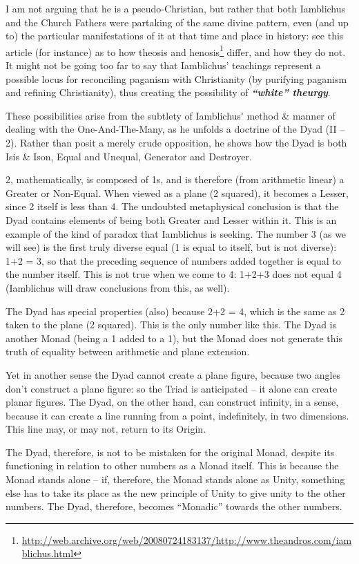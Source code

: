 I am not arguing that he is a pseudo-Christian, but rather that both Iamblichus and the Church Fathers were partaking of the same divine pattern, even (and up to) the particular manifestations of it at that time and place in history: see this article (for instance) as to how theosis and henosis\footnote{\url{http://web.archive.org/web/20080724183137/http://www.theandros.com/iamblichus.html}} differ, and how they do not. It might not be going too far to say that Iamblichus' teachings represent a possible locus for reconciling paganism with Christianity (by purifying paganism and refining Christianity), thus creating the possibility of \emph{\textbf{``white'' theurgy}}.


These possibilities arise from the subtlety of Iamblichus' method \& manner of dealing with the One-And-The-Many, as he unfolds a doctrine of the Dyad (II -- 2). Rather than posit a merely crude opposition, he shows how the Dyad is both Isis \& Ison, Equal and Unequal, Generator and Destroyer.

2, mathematically, is composed of 1s, and is therefore (from arithmetic linear) a Greater or Non-Equal. When viewed as a plane (2 squared), it becomes a Lesser, since 2 itself is less than 4. The undoubted metaphysical conclusion is that the Dyad contains elements of being both Greater and Lesser within it. This is an example of the kind of paradox that Iamblichus is seeking. The number 3 (as we will see) is the first truly diverse equal (1 is equal to itself, but is not diverse): 1+2 = 3, so that the preceding sequence of numbers added together is equal to the number itself. This is not true when we come to 4: 1+2+3 does not equal 4 (Iamblichus will draw conclusions from this, as well).

The Dyad has special properties (also) because 2+2 = 4, which is the same as 2 taken to the plane (2 squared). This is the only number like this. The Dyad is another Monad (being a 1 added to a 1), but the Monad does not generate this truth of equality between arithmetic and plane extension.

Yet in another sense the Dyad cannot create a plane figure, because two angles don't construct a plane figure: so the Triad is anticipated -- it alone can create planar figures. The Dyad, on the other hand, can construct infinity, in a sense, because it can create a line running from a point, indefinitely, in two dimensions. This line may, or may not, return to its Origin.

The Dyad, therefore, is not to be mistaken for the original Monad, despite its functioning in relation to other numbers as a Monad itself. This is because the Monad stands alone -- if, therefore, the Monad stands alone as Unity, something else has to take its place as the new principle of Unity to give unity to the other numbers. The Dyad, therefore, becomes ``Monadic'' towards the other numbers.


